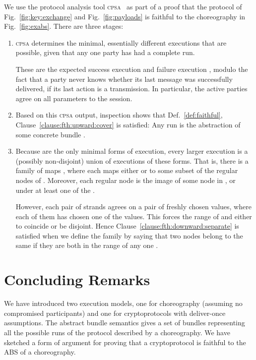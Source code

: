 \documentclass[copyright]{eptcs}
\newcommand{\NI}{\noindent}
\begin{document}
\smallskip

\NI {\bf Faithfulness in the Buyer-Seller protocol.} We use the
protocol analysis tool \textsc{cpsa}~\cite{DoghmiGuttmanThayer07} as
part of a proof that the protocol of Fig.~\ref{fig:key:exchange} and
Fig.~\ref{fig:payloads} is faithful to the choreography in
Fig.~\ref{fig:exabs}.  There are three stages:
\begin{enumerate}
  \item \textsc{cpsa} determines the minimal, essentially different
  executions that are possible, given that any one party has had a
  complete run.  

  These are the expected success execution  and failure
  execution , modulo the fact that a party never
  knows whether its last message was successfully delivered, if its
  last action is a transmission.  In particular, the active parties
  agree on all parameters to the session.
  \item Based on this \textsc{cpsa} output, inspection shows that
  Def.~\ref{def:faithful}, Clause~\ref{clause:fth:upward:cover} is
  satisfied:  Any run  is the abstraction of some
  concrete bundle .
  \item Because  are the only minimal
  forms of execution, every larger execution  is a (possibly
  non-disjoint) union of executions of these forms.  That is, there is
  a family of maps , where each  maps either 
  or  to some subset of the regular nodes of .
  Moreover, each regular node  is the image of some node
  in , or  under at least one of the
  .

  However, each pair of strands agrees on a pair of freshly chosen
  values, where each of them has chosen one of the values.  This
  forces the range of  and  either to coincide or be
  disjoint.  Hence Clause~\ref{clause:fth:downward:separate} is
  satisfied when we define the family  by saying that
  two nodes belong to the same  if they are both in the range
  of any one .    
\end{enumerate}






\section{Concluding Remarks}
We have introduced two execution models, one for choreography
(assuming no compromised participants) and one for cryptoprotocols
with deliver-once assumptions.  The abstract bundle semantics gives a
set of bundles representing all the possible runs of the protocol
described by a choreography.  We have sketched a form of argument for
proving that a cryptoprotocol is faithful to the ABS of a
choreography.
\end{document}
